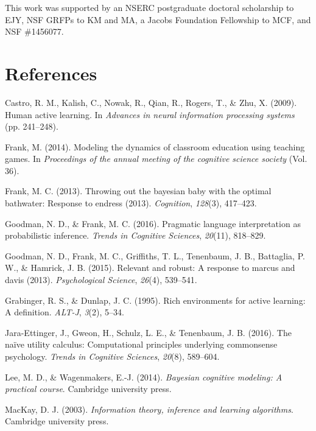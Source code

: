 \documentclass[10pt, letterpaper]{article}
\begin{document}
This work was supported by an NSERC postgraduate doctoral scholarship to
EJY, NSF GRFPs to KM and MA, a Jacobs Foundation Fellowship to MCF, and
NSF \#1456077.

\section{References}\label{references}

\setlength{\parindent}{-0.1in} \setlength{\leftskip}{0.125in}

\noindent

\hypertarget{refs}{}
\hypertarget{ref-castro2009human}{}
Castro, R. M., Kalish, C., Nowak, R., Qian, R., Rogers, T., \& Zhu, X.
(2009). Human active learning. In \emph{Advances in neural information
processing systems} (pp. 241--248).

\hypertarget{ref-frank2014modeling}{}
Frank, M. (2014). Modeling the dynamics of classroom education using
teaching games. In \emph{Proceedings of the annual meeting of the
cognitive science society} (Vol. 36).

\hypertarget{ref-frank2013throwing}{}
Frank, M. C. (2013). Throwing out the bayesian baby with the optimal
bathwater: Response to endress (2013). \emph{Cognition}, \emph{128}(3),
417--423.

\hypertarget{ref-goodman2016}{}
Goodman, N. D., \& Frank, M. C. (2016). Pragmatic language
interpretation as probabilistic inference. \emph{Trends in Cognitive
Sciences}, \emph{20}(11), 818--829.

\hypertarget{ref-goodman2015relevant}{}
Goodman, N. D., Frank, M. C., Griffiths, T. L., Tenenbaum, J. B.,
Battaglia, P. W., \& Hamrick, J. B. (2015). Relevant and robust: A
response to marcus and davis (2013). \emph{Psychological Science},
\emph{26}(4), 539--541.

\hypertarget{ref-grabinger1995rich}{}
Grabinger, R. S., \& Dunlap, J. C. (1995). Rich environments for active
learning: A definition. \emph{ALT-J}, \emph{3}(2), 5--34.

\hypertarget{ref-jara2016}{}
Jara-Ettinger, J., Gweon, H., Schulz, L. E., \& Tenenbaum, J. B. (2016).
The naïve utility calculus: Computational principles underlying
commonsense psychology. \emph{Trends in Cognitive Sciences},
\emph{20}(8), 589--604.

\hypertarget{ref-lee2014bayesian}{}
Lee, M. D., \& Wagenmakers, E.-J. (2014). \emph{Bayesian cognitive
modeling: A practical course}. Cambridge university press.

\hypertarget{ref-mackay2003}{}
MacKay, D. J. (2003). \emph{Information theory, inference and learning
algorithms}. Cambridge university press.
\end{document}
